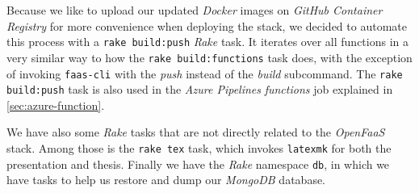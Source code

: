 Because we like to upload our updated \textit{Docker} images on \textit{GitHub Container Registry}
for more convenience when deploying the stack, we decided to automate this process with a
\lstinline{rake build:push} \textit{Rake} task. It iterates over all functions in a very similar way
to how the \lstinline{rake build:functions} task does, with the exception of invoking
\texttt{faas-cli} with the \textit{push} instead of the \textit{build} subcommand. The
\lstinline{rake build:push} task is also used in the \textit{Azure Pipelines} \textit{functions} job
explained in \autoref{sec:azure-function}.

We have also some \textit{Rake} tasks that are not directly related to the \textit{OpenFaaS} stack.
Among those is the \lstinline{rake tex} task, which invokes \texttt{latexmk} for both the
presentation and thesis. Finally we have the \textit{Rake} namespace \lstinline{db}, in which we
have tasks to help us restore and dump our \textit{MongoDB} database.
